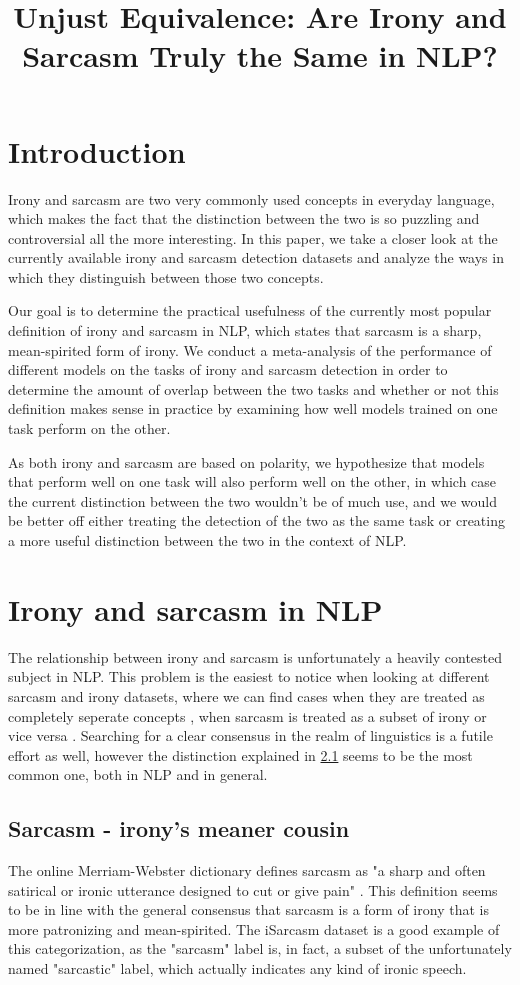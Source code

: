 \documentclass[10pt, a4paper]{article}
\title{Unjust Equivalence: Are Irony and Sarcasm Truly the Same in NLP?}
\begin{document}
\maketitleabstract

\section{Introduction}

Irony and sarcasm are two very commonly used concepts in everyday language, which makes the fact that the distinction 
between the two is so puzzling and controversial all the more interesting. In this paper, we take a closer look at the
currently available irony and sarcasm detection datasets and analyze the ways in which they distinguish between those two
concepts.

Our goal is to determine the practical usefulness of the currently most popular definition of irony and sarcasm in NLP, which
states that sarcasm is a sharp, mean-spirited form of irony. We conduct a meta-analysis of the performance of different
models on the tasks of irony and sarcasm detection in order to determine the amount of overlap between the two tasks and
whether or not this definition makes sense in practice by examining how well models trained on one task perform on the other.

As both irony and sarcasm are based on polarity, we hypothesize that models that perform well on one task will also perform
well on the other, in which case the current distinction between the two wouldn't be of much use, and we would be better off
either treating the detection of the two as the same task or creating a more useful distinction between the two in the context
of NLP.

\section{Irony and sarcasm in NLP}
The relationship between irony and sarcasm is unfortunately a heavily contested subject in NLP. This problem is the easiest
to notice when looking at different sarcasm and irony datasets, where we can find cases when they are treated as completely
seperate concepts \citep{kaggle-tweets}, when sarcasm is treated as a subset of irony \citep{semeval-2018} or vice
versa \citep{iSarcasm}. Searching for a clear consensus in the realm of linguistics is a futile effort as well, however the
distinction explained in \ref{sec:sarcasm_definition} seems to be the most common one, both in NLP and in general.

\subsection{Sarcasm - irony's meaner cousin}\label{sec:sarcasm_definition}
The online Merriam-Webster dictionary defines sarcasm as "a sharp and often satirical or ironic utterance designed to 
cut or give pain" \citep{mw-dictionary}. This definition seems to be in line with the general consensus that sarcasm is
a form of irony that is more patronizing and mean-spirited. The iSarcasm dataset \citep{iSarcasm} is a good example of this 
categorization, as the "sarcasm" label is, in fact, a subset of the unfortunately named "sarcastic" label, which actually 
indicates any kind of ironic speech. 
\end{document}
